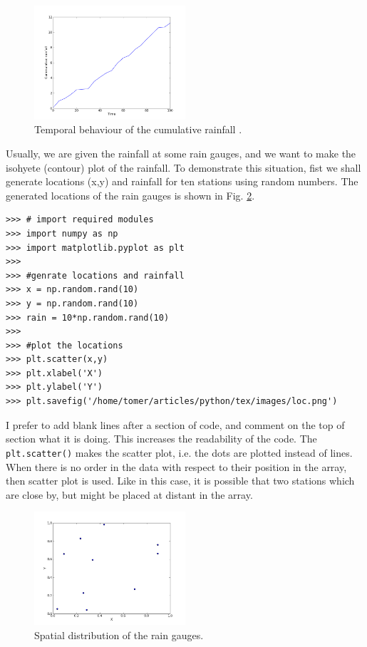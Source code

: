 \documentclass[10pt]{book}
\begin{document}
{\beforefig
\begin{figure}[h!]
  \centering
    \includegraphics[width=0.5\textwidth]{images/cum_rain.png}
  \caption{Temporal behaviour of the cumulative rainfall . }
  \label{fig:cum_rain}
\end{figure}
\afterfig

Usually, we are given the rainfall at some rain gauges, and we want to make the isohyete (contour) plot of the rainfall. To demonstrate this situation, fist we shall generate locations  (x,y) and rainfall for ten stations using random numbers. The generated locations of the rain gauges is shown in Fig. \ref{fig:loc}. 
\beforeverb \begin{verbatim}
>>> # import required modules
>>> import numpy as np
>>> import matplotlib.pyplot as plt
>>> 
>>> #genrate locations and rainfall
>>> x = np.random.rand(10)
>>> y = np.random.rand(10)
>>> rain = 10*np.random.rand(10)
>>> 
>>> #plot the locations
>>> plt.scatter(x,y)
>>> plt.xlabel('X')
>>> plt.ylabel('Y')
>>> plt.savefig('/home/tomer/articles/python/tex/images/loc.png')
\end{verbatim} \afterverb
I prefer to add blank lines after a section of code, and comment on the top of section what it is doing. This increases the readability of the code. The \verb"plt.scatter()" makes the scatter plot, i.e. the dots are plotted instead of lines. When there is no order in the data with respect to their position in the array, then scatter plot is used. Like in this case, it is possible that two stations which are close by, but might be placed at distant in the array. 
\beforefig \begin{figure}[h!]
  \centering
    \includegraphics[width=0.5\textwidth]{images/loc.png}
  \caption{Spatial distribution of the rain gauges.}
   \label{fig:loc}
\end{figure}
\afterfig

}
\end{document}
